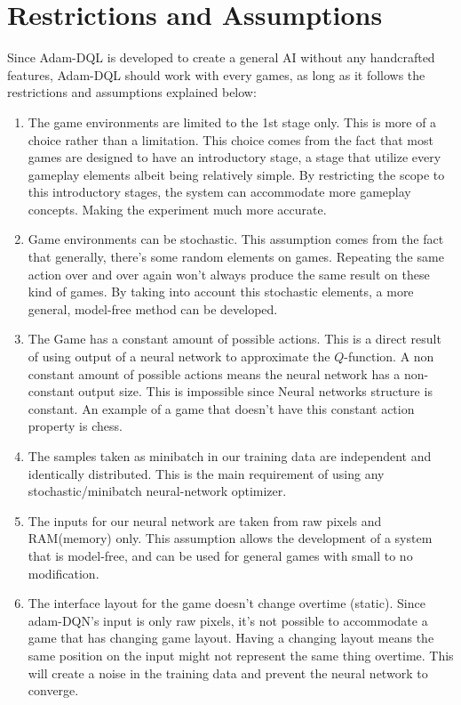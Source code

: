	\section{Restrictions and Assumptions}
	    Since Adam-DQL is developed to create a general AI without any handcrafted features, Adam-DQL should work with every games, as long as it follows the restrictions and assumptions explained below:
        \begin{enumerate}
         \item The game environments are limited to the 1st stage only. This is more of a choice rather than a limitation. This choice comes from the fact that most games are designed to have an introductory stage, a stage that utilize every gameplay elements albeit being relatively simple. By restricting the scope to this introductory stages, the system can accommodate more gameplay concepts. Making the experiment much more accurate.
        \item Game environments can be stochastic. This assumption comes from the fact that generally, there's some random elements on games. Repeating the same action over and over again won't always produce the same result on these kind of games. By taking into account this stochastic elements, a more general, model-free method can be developed. 
        \item The Game has a constant amount of possible actions.
        This is a direct result of using output of a neural network to approximate the $Q$-function. A non constant amount of possible actions means the neural network has a non-constant output size. This is impossible since Neural networks structure is constant. An example of a game that doesn't have this constant action property is chess.
        \item The samples taken as minibatch in our training data are independent and identically distributed. This is the main requirement of using any stochastic/minibatch neural-network optimizer.
        \item The inputs for our neural network are taken from raw pixels and RAM(memory) only. This assumption allows the development of a system that is model-free, and can be used for general games with small to no modification.
        \item The interface layout for the game doesn't change overtime (static). Since adam-DQN's input is only raw pixels, it's not possible to accommodate a game that has changing game layout. Having a changing layout means the same position on the input might not represent the same thing overtime. This will create a noise in the training data and prevent the neural network to converge.
        \end{enumerate}
	

